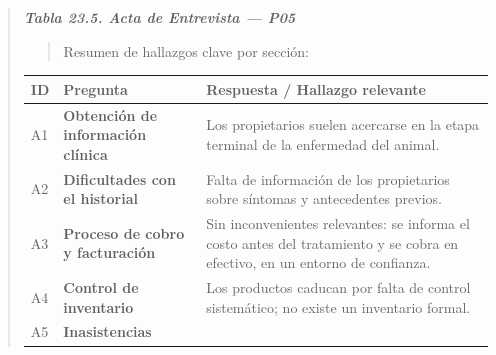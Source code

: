 \documentclass[
]{article}
\newcounter{none} %
\begin{document}
\begin{quote}
\protect{}\label{_bookmark_P05_acta}{}\emph{\textbf{Tabla 23.5. Acta de Entrevista --- P05}}

\begin{quote}
Resumen de hallazgos clave por sección:
\end{quote}

{\def\LTcaptype{none} %
\begin{longtable}[]{|
  >{\centering\arraybackslash}p{}|
  >{\raggedright\arraybackslash}p{}|
  >{\raggedright\arraybackslash}p{}|}
\hline
\begin{minipage}[b]{\linewidth}\centering
\textbf{ID}
\end{minipage} & \begin{minipage}[b]{\linewidth}\centering
\textbf{Pregunta}
\end{minipage} & \begin{minipage}[b]{\linewidth}\raggedright
\textbf{Respuesta / Hallazgo relevante}
\end{minipage} \\
\hline
\endhead
\hline
\endlastfoot
A1 & \textbf{Obtención de información clínica} &
\begin{minipage}[t]{\linewidth}\raggedright
Los propietarios suelen acercarse en la etapa terminal de la enfermedad del animal.
\end{minipage} \\
\hline
A2 & \textbf{Dificultades con el historial} &
\begin{minipage}[t]{\linewidth}\raggedright
Falta de información de los propietarios sobre síntomas y antecedentes previos.
\end{minipage} \\
\hline
A3 & \textbf{Proceso de cobro y facturación} &
\begin{minipage}[t]{\linewidth}\raggedright
Sin inconvenientes relevantes: se informa el costo antes del tratamiento y se cobra en efectivo, en un entorno de confianza.
\end{minipage} \\
\hline
A4 & \textbf{Control de inventario} &
\begin{minipage}[t]{\linewidth}\raggedright
Los productos caducan por falta de control sistemático; no existe un inventario formal.
\end{minipage} \\
\hline
A5 & \textbf{Inasistencias} &
\begin{minipage}[t]{\linewidth}\raggedright

\end{minipage}
\end{longtable}}
\end{quote}
\end{document}
